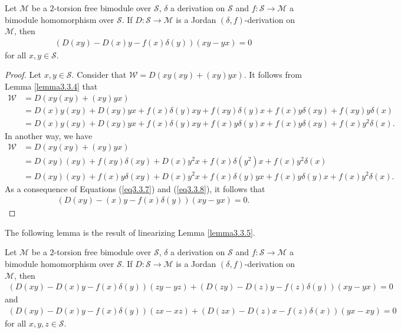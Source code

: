 \documentclass{arxiv}
\begin{document}
\begin{lemma}\label{lemma3.3.5}
    Let $\mathcal{M}$ be a $2$-torsion free bimodule over $\mathcal{S}$, $\delta$ a derivation on $\mathcal{S}$ and $f : \mathcal{S} \rightarrow \mathcal{M}$ a bimodule homomorphism over $\mathcal{S}$. If $D:\mathcal{S} \rightarrow \mathcal{M}$ is a Jordan $(\delta,f)$-derivation on $\mathcal{M}$, then 
    \begin{align*}
        (D(xy)-D(x)y-f(x)\delta (y))(xy-yx)=0
    \end{align*}
    for all $x,y \in \mathcal{S}$.
\end{lemma}
\begin{proof}
    Let $x,y \in \mathcal{S}$. Consider that $\mathcal{W}=D(xy(xy)+(xy)yx)$. It follows from  Lemma \ref{lemma3.3.4} that
    \begin{align}
        \mathcal{W} &= D(xy(xy)+(xy)yx)\nonumber \\
        &= D(x)y(xy) + D(xy)yx + f(x) \delta (y) xy + f(xy)\delta (y) x + f(x)y \delta (xy) + f(xy)y\delta (x)\nonumber \\
        &= D(x) y (xy) + D(xy) yx + f(x) \delta (y) xy + f(x)y\delta (y)x + f(x) y \delta (xy) + f(x)y^2 \delta (x). \label{eq3.3.7}
    \end{align}
    In another way, we have
    \begin{align}
        \mathcal{W} &= D(xy(xy)+(xy)yx) \nonumber \\
        &= D(xy)(xy) + f(xy)\delta (xy) + D(x)y^2x + f(x)\delta (y^2) x + f(x)y^2 \delta (x) \nonumber \\
        &= D(xy)(xy) + f(x) y \delta (xy) + D(x) y^2 x + f(x) \delta (y) yx + f(x) y \delta (y)x + f(x) y^2 \delta (x). \label{eq3.3.8}
    \end{align}
    As a consequence of Equations (\ref{eq3.3.7}) and (\ref{eq3.3.8}), it follows that
    \begin{align*}
(D(xy)-(x)y-f(x)\delta(y))(xy-yx)=0.
    \end{align*}
\end{proof}

The following lemma is the result of linearizing Lemma \ref{lemma3.3.5}.
\begin{lemma}\label{lemma3.3.6}
    Let $\mathcal{M}$ be a $2$-torsion free bimodule over $\mathcal{S}$, $\delta$ a derivation on $\mathcal{S}$ and $f : \mathcal{S} \rightarrow \mathcal{M}$ a bimodule homomorphism over $\mathcal{S}$. If $D:\mathcal{S} \rightarrow \mathcal{M}$ is a Jordan $(\delta,f)$-derivation on $\mathcal{M}$, then
    \begin{align*}
         (D(xy)-D(x)y-f(x)\delta (y))(zy-yz) + (D(zy)-D(z)y-f(z)\delta (y))(xy-yx) = 0
    \end{align*}
    and
    \begin{align*}
        (D(xy)-D(x)y-f(x)\delta(y))(zx-xz)+(D(zx)-D(z)x-f(z)\delta(x))(yx-xy) =0
    \end{align*}
    for all $x,y,z \in \mathcal{S}$.
\end{lemma}
\end{document}
